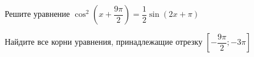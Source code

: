 \begin{ex}
	\begin{condition}
		\begin{enumcols}[label=\asbuk*)]
			\item Решите уравнение \( \cos^2 {\left(x + \dfrac{9\pi}{2}\right)}= \dfrac{1}{2}\sin{(2x+\pi)} \)
			\item Найдите все корни уравнения, принадлежащие отрезку \( \left[-\dfrac{9\pi}{2};-3\pi\right] \)
		\end{enumcols}
	\end{condition}
\end{ex}